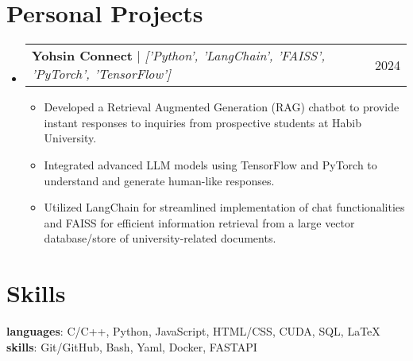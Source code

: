 \documentclass{article}
\makeatletter
\newcommand{\resumeItem}[1]{
  \item\small{
    {#1 \vspace{-2pt}}
  }
}
\newcommand{\resumeProjectHeading}[2]{
    \item
    \begin{tabular*}{0.97\textwidth}{l@{\extracolsep{\fill}}r}
      \small#1 & #2 \\
    \end{tabular*}\vspace{-7pt}
}
\newcommand{\resumeSubHeadingListStart}{\begin{itemize}[leftmargin=0.15in, label={}]}
\newcommand{\resumeSubHeadingListEnd}{\end{itemize}}
\newcommand{\resumeItemListStart}{\begin{itemize}}
\newcommand{\resumeItemListEnd}{\end{itemize}\vspace{-5pt}}
\makeatother
\begin{document}
\section{Personal Projects}
\resumeSubHeadingListStart

    \resumeProjectHeading
    {\textbf{Yohsin Connect} $|$ \footnotesize\emph{['Python', 'LangChain', 'FAISS', 'PyTorch', 'TensorFlow']}}{2024}
    \resumeItemListStart
        \resumeItem{Developed a Retrieval Augmented Generation (RAG) chatbot to provide instant responses to inquiries from prospective students at Habib University.}
        \resumeItem{Integrated advanced LLM models using TensorFlow and PyTorch to understand and generate human-like responses.}
        \resumeItem{Utilized LangChain for streamlined implementation of chat functionalities and FAISS for efficient information retrieval from a large vector database/store of university-related documents.}
    \resumeItemListEnd
\resumeSubHeadingListEnd



\section{Skills}
 \begin{itemize}[leftmargin=0.15in, label={}]
    \small{\item{
     \textbf{languages}{: C/C++, Python, JavaScript, HTML/CSS, CUDA, SQL, LaTeX }\\
     \textbf{skills}{: Git/GitHub, Bash, Yaml, Docker, FASTAPI }\\
    }}
 \end{itemize}
\end{document}
